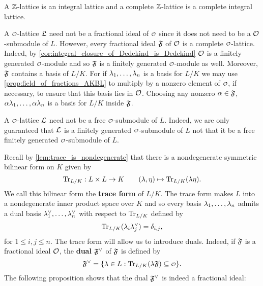     \begin{remark}
      A $\mathbb{Z}$-lattice is an integral lattice and a complete $\mathbb{Z}$-lattice is a complete integral lattice.
    \end{remark}

    A $\smc{O}$-lattice $\mathfrak{L}$ need not be a fractional ideal of $\smc{O}$ since it does not need to be a $\mathcal{O}$-submodule of $L$. However, every fractional ideal $\mathfrak{F}$ of $\mathcal{O}$ is a complete $\smc{O}$-lattice. Indeed, by \cref{cor:integral_closure_of_Dedekind_is_Dedekind} $\mathcal{O}$ is a finitely generated $\smc{O}$-module and so $\mathfrak{F}$ is a finitely generated $\smc{O}$-module as well. Moreover, $\mathfrak{F}$ contains a basis of $L/K$. For if $\lambda_{1},\ldots,\lambda_{n}$ is a basis for $L/K$ we may use \cref{prop:field_of_fractions_AKBL} to multiply by a nonzero element of $\smc{O}$, if necessary, to ensure that this basis lies in $\mathcal{O}$. Choosing any nonzero $\alpha \in \mathfrak{F}$, $\alpha\lambda_{1},\ldots,\alpha\lambda_{n}$ is a basis for $L/K$ inside $\mathfrak{F}$.

    \begin{remark}
      A $\smc{O}$-lattice $\mathcal{L}$ need not be a free $\smc{O}$-submodule of $L$. Indeed, we are only guaranteed that $\mathcal{L}$ is a finitely generated $\smc{O}$-submodule of $L$ not that it be a free finitely generated $\smc{O}$-submodule of $L$.
    \end{remark}
    
    Recall by \cref{lem:trace_is_nondegenerate} that there is a nondegenerate symmetric bilinear form on $K$ given by
    \[
      \operatorname{\mathrm{Tr}}_{L/K}:L \times L \to K \qquad (\lambda,\eta) \mapsto \operatorname{\mathrm{Tr}}_{L/K}(\lambda\eta).
    \]
    We call this bilinear form the \textbf{trace form} of $L/K$. The trace form makes $L$ into a nondegenerate inner product space over $K$ and so every basis $\lambda_{1},\ldots,\lambda_{n}$ admits a dual basis $\lambda_{1}^{\vee},\ldots,\lambda_{n}^{\vee}$ with respect to $\operatorname{\mathrm{Tr}}_{L/K}$ defined by
    \[
      \operatorname{\mathrm{Tr}}_{L/K}(\lambda_{i}\lambda_{j}^{\vee}) = \delta_{i,j},
    \]
    for $1 \le i,j \le n$. The trace form will allow us to introduce duals. Indeed, if $\mathfrak{F}$ is a fractional ideal $\mathcal{O}$, the \textbf{dual} $\mathfrak{F}^{\vee}$ of $\mathfrak{F}$ is defined by
    \[
      \mf{F}^{\vee} = \{\l \in L:\Trace_{L/K}(\l\mf{F}) \subseteq \smc{O}\}.
    \]
    The following proposition shows that the dual $\mathfrak{F}^{\vee}$ is indeed a fractional ideal:

